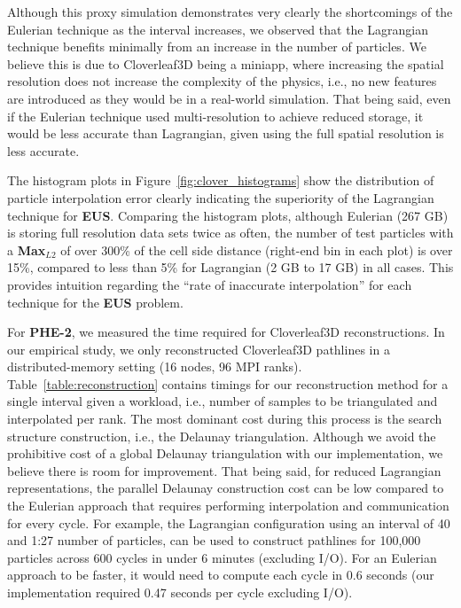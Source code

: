 Although this proxy simulation demonstrates very clearly the shortcomings of the Eulerian technique as the interval increases, we observed that the Lagrangian technique benefits minimally from an increase in the number of particles.
%
We believe this is due to Cloverleaf3D being a miniapp, where increasing the spatial resolution does not increase the complexity of the physics, i.e., no new features are introduced as they would be in a real-world simulation.
%
That being said, even if the Eulerian technique used multi-resolution to achieve reduced storage, it would be less accurate than Lagrangian, given using the full spatial resolution is less accurate. 

The histogram plots in Figure~\ref{fig:clover_histograms} show the distribution of particle interpolation error clearly indicating the superiority of the Lagrangian technique for \textbf{EUS}.
%
Comparing the histogram plots, although Eulerian (267 GB) is storing full resolution data sets twice as often, the number of test particles with a \textbf{Max$_{L2}$} of over 300\% of the cell side distance (right-end bin in each plot) is over 15\%, compared to less than 5\% for Lagrangian (2 GB to 17 GB) in all cases.
%
This provides intuition regarding the ``rate of inaccurate interpolation'' for each technique for the \textbf{EUS} problem.


For \textbf{PHE-2}, we measured the time required for Cloverleaf3D reconstructions.
%
In our empirical study, we only reconstructed Cloverleaf3D pathlines in a distributed-memory setting (16 nodes, 96 MPI ranks).
%
Table~\ref{table:reconstruction} contains timings for our reconstruction method for a single interval given a workload, i.e., number of samples to be triangulated and interpolated per rank.
%
%
%
The most dominant cost during this process is the search structure construction, i.e., the Delaunay triangulation.
%
Although we avoid the prohibitive cost of a global Delaunay triangulation with our implementation, we believe there is room for improvement.
%
That being said, for reduced Lagrangian representations, the parallel Delaunay construction cost can be low compared to the Eulerian approach that requires performing interpolation and communication for every cycle.
%
For example, the Lagrangian configuration using an interval of 40 and 1:27 number of particles, can be used to construct pathlines for 100,000 particles across 600 cycles in under 6 minutes (excluding I/O).
%
For an Eulerian approach to be faster, it would need to compute each cycle in 0.6 seconds (our implementation required 0.47 seconds per cycle excluding I/O).



